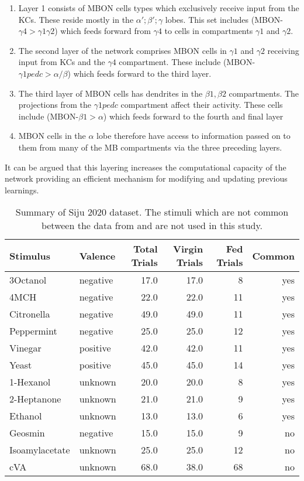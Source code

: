 \documentclass[11pt, A4]{article}
\begin{document}
\begin{multicols}{2}
\begin{enumerate}
\item
Layer 1 consists of MBON cells types which exclusively receive input from the KCs. These reside mostly in the $\alpha'; \beta'; \gamma$ lobes. This set includes  (MBON-$\gamma 4> \gamma 1 \gamma2$) which feeds forward from $\gamma 4$ to cells in compartments $\gamma 1$ and $\gamma 2$. 
%
\item
The second layer of the network comprises MBON cells in $\gamma 1$ and $\gamma 2$ receiving input from KCs and the $\gamma 4$ compartment. These include (MBON-$\gamma 1pedc > \alpha / \beta$) which feeds forward to the third layer.
%
\item
The third layer of MBON cells has dendrites in the $\beta1, \beta2$ compartments. The projections from the $\gamma 1pedc$ compartment affect their activity. These cells include  (MBON-$\beta 1 > \alpha$) which feeds forward to the fourth and final layer
%
\item
MBON cells in the $\alpha$ lobe therefore have access to information passed on to them from many of the MB compartments via the three preceding layers.
\end{enumerate}


It can be argued that this layering increases the computational capacity of the network providing an efficient mechanism for modifying and updating previous learnings.


\begin{table*}[t]
\begin{center}
\begin{tabular}{l | l | r | r | r | r }
\hline
Stimulus & Valence & Total Trials & Virgin Trials  & Fed Trials & Common \\
\hline
3Octanol        &  negative & 17.0 &  17.0&  8 & yes \\
4MCH             & negative & 22.0 &22.0& 11 &  yes \\
Citronella        & negative & 49.0 & 49.0&  11 &yes \\
Peppermint       & negative &25.0 & 25.0&  12 & yes \\
Vinegar           & positive & 42.0 & 42.0&  11 & yes \\
Yeast            & positive & 45.0 & 45.0 & 14 &yes \\
1-Hexanol      & unknown &   20.0 &    20.0 & 8 &   yes \\
2-Heptanone & unknown &      21.0 &      21.0& 9 &  yes \\
Ethanol           & unknown &13.0 & 13.0&  6 &yes \\
Geosmin         & negative &  15.0 & 15.0& 9&  no \\
Isoamylacetate & unknown &   25.0 & 25.0& 12& no \\
cVA              & unknown & 68.0 & 38.0 & 68  & no \\
\hline
\end{tabular}
\end{center}
\caption{Summary of Siju 2020 dataset. The stimuli which are not common between the data from  \cite{siju2020} and \cite{hige2015} are not used in this study.}
\label{tab:siju_data}
\label{default}
\end{table*}%



\end{multicols}
\end{document}
